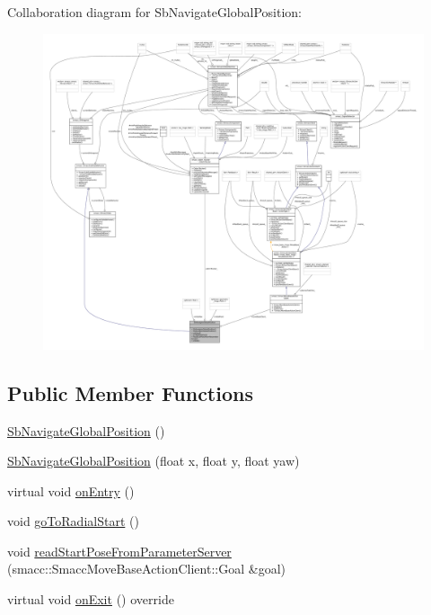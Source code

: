 Collaboration diagram for Sb\+Navigate\+Global\+Position\+:
\nopagebreak
\begin{figure}[H]
\begin{center}
\leavevmode
\includegraphics[width=350pt]{classSbNavigateGlobalPosition__coll__graph}
\end{center}
\end{figure}
\subsection*{Public Member Functions}
\begin{DoxyCompactItemize}
\item 
\hyperlink{classSbNavigateGlobalPosition_a6e1b74179781852ff41ffee65f1f01f4}{Sb\+Navigate\+Global\+Position} ()
\item 
\hyperlink{classSbNavigateGlobalPosition_a4215729ce8800e8fcfb30a120626348e}{Sb\+Navigate\+Global\+Position} (float x, float y, float yaw)
\item 
virtual void \hyperlink{classSbNavigateGlobalPosition_ae4c1f2e5de1077ee88d506eb69099f0c}{on\+Entry} ()
\item 
void \hyperlink{classSbNavigateGlobalPosition_a37b56e88ae4b01413c8fff19ee319769}{go\+To\+Radial\+Start} ()
\item 
void \hyperlink{classSbNavigateGlobalPosition_a497b26df556f99524164619deb5b2352}{read\+Start\+Pose\+From\+Parameter\+Server} (smacc\+::\+Smacc\+Move\+Base\+Action\+Client\+::\+Goal \&goal)
\item 
virtual void \hyperlink{classSbNavigateGlobalPosition_a1529072c6977d17a1ffd2274ec95ca09}{on\+Exit} () override
\end{DoxyCompactItemize}
